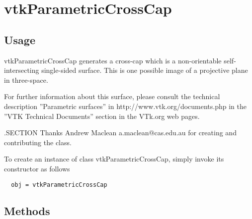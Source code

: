 \section{vtkParametricCrossCap}

\subsection{Usage}

 vtkParametricCrossCap generates a cross-cap which is a 
 non-orientable self-intersecting single-sided surface.
 This is one possible image of a projective plane in three-space.

 For further information about this surface, please consult the 
 technical description ''Parametric surfaces'' in http://www.vtk.org/documents.php 
 in the ''VTK Technical Documents'' section in the VTk.org web pages.

 .SECTION Thanks
 Andrew Maclean a.maclean@cas.edu.au for 
 creating and contributing the class.


To create an instance of class vtkParametricCrossCap, simply
invoke its constructor as follows
\begin{verbatim}
  obj = vtkParametricCrossCap
\end{verbatim}
\subsection{Methods}

